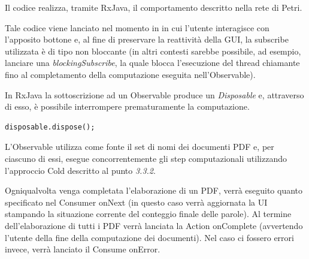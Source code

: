 \noindent Il codice realizza, tramite RxJava, il comportamento descritto nella rete di Petri.\newline

\noindent Tale codice viene lanciato nel momento in in cui l'utente interagisce con l'apposito  bottone e, al fine di preservare la reattività della GUI, la subscribe utilizzata è di tipo non bloccante (in altri contesti sarebbe possibile, ad esempio, lanciare una \textit{blockingSubscribe}, la quale blocca l'esecuzione del thread chiamante fino al completamento della computazione eseguita nell'Observable). \newline

\noindent In RxJava la sottoscrizione ad un Observable produce un \textit{Disposable} e, attraverso di esso, è possibile interrompere prematuramente la computazione.

\begin{verbatim}
disposable.dispose();
\end{verbatim}

\noindent L'Observable utilizza come fonte il set di nomi dei documenti PDF e, per ciascuno di essi, esegue concorrentemente gli step computazionali utilizzando l'approccio Cold descritto al punto \textit{3.3.2}.\newline

\noindent Ogniqualvolta venga completata l'elaborazione di un PDF, verrà eseguito quanto specificato nel Consumer onNext (in questo caso verrà aggiornata la UI stampando la situazione corrente del conteggio finale delle parole).\newline
\noindent Al termine dell'elaborazione di tutti i PDF verrà lanciata la Action onComplete (avvertendo l'utente della fine della computazione dei documenti).\newline
\noindent Nel caso ci fossero errori invece, verrà lanciato il Consume onError.
